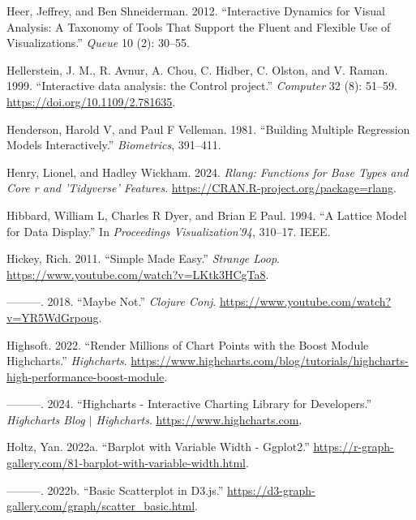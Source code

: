 \documentclass[
  openany]{book}
\newlength{\cslhangindent}
\newenvironment{CSLReferences}[2] %
 {\begin{list}{}{%
  \setlength{\itemindent}{0pt}
  \setlength{\leftmargin}{0pt}
  \setlength{\parsep}{0pt}
  \ifodd #1
   \setlength{\leftmargin}{\cslhangindent}
   \setlength{\itemindent}{-1\cslhangindent}
  \fi
  \setlength{\itemsep}{#2\baselineskip}}}
 {\end{list}}
\theoremstyle{definition}
\theoremstyle{definition}
\theoremstyle{definition}
\theoremstyle{definition}
\theoremstyle{remark}
\begin{document}
\begin{CSLReferences}{1}{0}
Heer, Jeffrey, and Ben Shneiderman. 2012. {``Interactive Dynamics for Visual Analysis: A Taxonomy of Tools That Support the Fluent and Flexible Use of Visualizations.''} \emph{Queue} 10 (2): 30--55.

Hellerstein, J. M., R. Avnur, A. Chou, C. Hidber, C. Olston, and V. Raman. 1999. {``{Interactive data analysis: the Control project}.''} \emph{Computer} 32 (8): 51--59. \url{https://doi.org/10.1109/2.781635}.

Henderson, Harold V, and Paul F Velleman. 1981. {``Building Multiple Regression Models Interactively.''} \emph{Biometrics}, 391--411.

Henry, Lionel, and Hadley Wickham. 2024. \emph{Rlang: Functions for Base Types and Core r and 'Tidyverse' Features}. \url{https://CRAN.R-project.org/package=rlang}.

Hibbard, William L, Charles R Dyer, and Brian E Paul. 1994. {``A Lattice Model for Data Display.''} In \emph{Proceedings Visualization'94}, 310--17. IEEE.

Hickey, Rich. 2011. {``Simple Made Easy.''} \emph{Strange Loop}. \url{https://www.youtube.com/watch?v=LKtk3HCgTa8}.

---------. 2018. {``Maybe Not.''} \emph{Clojure Conj}. \url{https://www.youtube.com/watch?v=YR5WdGrpoug}.

Highsoft. 2022. {``Render Millions of Chart Points with the Boost Module {\textendash} Highcharts.''} \emph{Highcharts}. \url{https://www.highcharts.com/blog/tutorials/highcharts-high-performance-boost-module}.

---------. 2024. {``Highcharts - Interactive Charting Library for Developers.''} \emph{Highcharts Blog {\(\vert\)} Highcharts}. \url{https://www.highcharts.com}.

Holtz, Yan. 2022a. {``Barplot with Variable Width - Ggplot2.''} \url{https://r-graph-gallery.com/81-barplot-with-variable-width.html}.

---------. 2022b. {``Basic Scatterplot in D3.js.''} \url{https://d3-graph-gallery.com/graph/scatter_basic.html}.


\end{CSLReferences}
\end{document}
